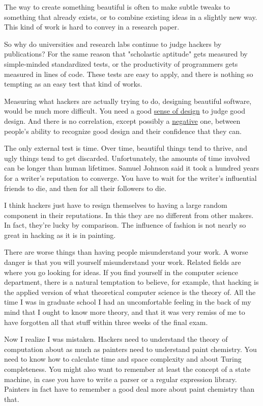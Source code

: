 The way to create something beautiful is often to make subtle
tweaks to something that already exists, or to combine existing
ideas in a slightly new way.  This kind of work is hard to
convey in a research paper.



So why do universities and research labs continue to judge
hackers by publications?
For the same reason that "scholastic aptitude"
gets measured by simple-minded standardized tests, or
the productivity of programmers gets measured in lines of code.
These tests
are easy to apply, and there is nothing so tempting as an easy test
that kind of works.

Measuring what hackers are actually trying to do, designing
beautiful software, would be much more difficult.  You need
a good \href{http://www.paulgraham.com/taste.html}{sense of design} to judge 
good design.  And
there is no correlation, except possibly
a \href{http://www.apa.org/journals/features/psp7761121.pdf}{negative} 
one, between people's ability to recognize good
design and their confidence that they can.

The only external test is time.  Over time, beautiful
things tend to thrive, and ugly
things tend to get discarded.  Unfortunately, the amounts of time
involved can be longer than human lifetimes.  Samuel Johnson
said it took a hundred years for a writer's reputation to
converge.  You have to wait for the writer's
influential friends to die, and then for all their followers
to die.

I think hackers just have to resign themselves to having a large random
component in their reputations.  In this they are no different
from other makers.  In fact, they're lucky by comparison.   
The influence of fashion is not nearly so great in hacking as it
is in painting.



There are worse things than having people misunderstand your
work.  A worse danger is that you
will yourself misunderstand your work.  Related fields are
where you go looking for ideas.  If you find yourself in the computer science
department, there is a natural temptation to believe, for example,
that hacking is the applied version of what theoretical computer
science is the theory of.   All
the time I was in graduate school I had an uncomfortable feeling
in the back of my mind that I ought to know more theory,
and that it was very remiss of me to have forgotten all that
stuff within three weeks of the final exam.

Now I realize I was
mistaken.  Hackers need to understand the theory of computation
about as much as painters need to understand paint chemistry.
You need to know how to calculate time and
space complexity and about
Turing completeness.  You might also want to remember at
least the concept of a state machine, in case you have to write
a parser or a regular expression library.  Painters in fact   
have to remember a good deal more about paint chemistry than 
that.

